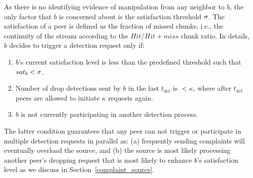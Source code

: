 As there is no identifying evidence of manipulation from any neighbor to $b$, the only factor that $b$ is concerned about is the satisfaction threshold $\sigma$.
The satisfaction of a peer is defined as the fraction of missed chunks, i.e., the continuity of the stream according to the $Hit/Hit+miss$ chunk ratio.
In details, $b$ decides to trigger a detection request only if:
\begin{enumerate}
 \item $b$'s current satisfaction level is less than the predefined threshold such that $sat_b < \sigma$.
 \item Number of drop detections sent by $b$ in the last $t_{det}$ is $< \kappa$, where after $t_{det}$ peers are allowed to initiate $\kappa$ requests again.
 \item $b$ is not currently participating in another \drop detection process.
\end{enumerate}
The latter condition guarantees that any peer can not trigger or participate in multiple detection requests in parallel as: (a) frequently sending complaints will eventually overload the source,
and (b) the source is most likely processing another peer's dropping request that is most likely to enhance $b$'s satisfaction level as we discuss in Section~\ref{complaint_source}.

